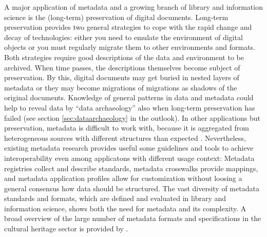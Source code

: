 A major application of metadata and a growing branch of library and information
science is the (long-term) preservation of digital documents. Long-term
preservation provides two general strategies to cope with the rapid change and
decay of technologies: either you need to emulate the environment of digital
objects or you must regularly migrate them to other environments and formats.
Both strategies require good descriptions of the data and environment to be
archived.  When time passes, the descriptions themselves become subject of
preservation. By this, digital documents may get buried in nested layers of
metadata or they may become migrations of migrations as shadows of the original
documents. Knowledge of general patterns in data and metadata could help to
reveal data by ``data archaeology'' also when long-term preservation has failed
(see section \ref{sec:dataarchaeology} in the outlook). In other applications
but preservation, metadata is difficult to work with, because it is aggregated
from heterogeneous sources with different structures than expected
\cite{Tennant2004,Thomale2010}.  Nevertheless, existing metadata research
provides useful some guidelines and tools to achieve interoperability even
among applicatons with different usage context: Metadata registries collect and
describe standards, metadata crosswalks provide mappings, and metadata
application profiles allow for customization without loosing a general
consensus how data should be structured.  The vast diversity of metadata
standards and formats, which are defined and evaluated in library and
information science, shows both the need for metadata and its complexity.
A broad overview of the large number of metadata formats and specifications 
in the cultural heritage sector is provided by \textcite{Riley2010}.





